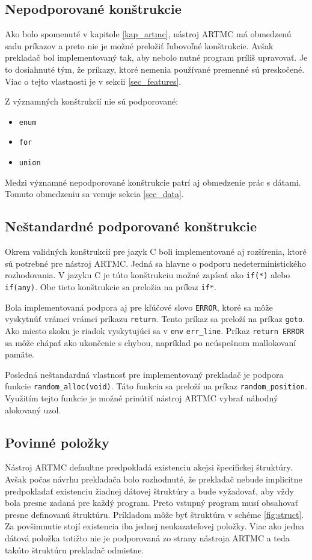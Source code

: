 \subsection{Nepodporované konštrukcie}
Ako bolo spomenuté v kapitole \ref{kap_artmc}, nástroj ARTMC má obmedzenú sadu príkazov a preto nie je možné preložiť ľubovoľné konštrukcie. Avšak prekladač bol implementovaný tak, aby nebolo nutné program príliš upravovať. Je to dosiahnuté tým, že príkazy, ktoré nemenia používané premenné sú preskočené. Viac o tejto vlastnosti je v sekcii \ref{sec_features}.

Z významných konštrukcií nie sú podporované:
\begin{itemize}
\item \texttt{enum}
\item \texttt{for}
\item \texttt{union}
\end{itemize}

Medzi významné nepodporované konštrukcie patrí aj obmedzenie prác s dátami. Tomuto obmedzeniu sa venuje sekcia \ref{sec_data}.

\subsection{Neštandardné podporované konštrukcie}
Okrem validných konštrukcií pre jazyk C boli implementované aj rozšírenia, ktoré sú potrebné pre nástroj ARTMC. Jedná sa hlavne o podporu nedeterministického rozhodovania. V jazyku C je túto konštrukciu možné zapísať ako \texttt{if(*)} alebo \texttt{if(any)}. Obe tieto konštrukcie sa preložia na príkaz \texttt{if*}.

Bola implementovaná podpora aj pre kľúčové slovo \texttt{ERROR}, ktoré sa môže vyskytnúť vrámci vrámci príkazu \texttt{return}. Tento príkaz sa preloží na príkaz \texttt{goto}. Ako miesto skoku je riadok vyskytujúci sa v \texttt{env} \texttt{err\_line}. Príkaz \texttt{return ERROR} sa môže chápať ako ukončenie s chybou, napríklad po neúspešnom mallokovaní pamäte.

Posledná neštandardná vlastnosť pre implementovaný prekladač je podpora funkcie \texttt{random\_alloc(void)}. Táto funkcia sa preloží na príkaz \texttt{random\_position}. Využitím tejto funkcie je možné prinútiť nástroj ARTMC vybrať náhodný alokovaný uzol.

\subsection{Povinné položky}
Nástroj ARTMC defaultne predpokladá existenciu akejsi špecifickej štruktúry. Avšak počas návrhu prekladača bolo rozhodnuté, že prekladač nebude implicitne predpokladať existenciu žiadnej dátovej štruktúry a bude vyžadovať, aby vždy bola presne zadaná pre každý program. Preto vstupný program musí obsahovať presne definovanú štruktúru. Príkladom môže byť štruktúra v schéme \ref{fig:struct}. Za povšimnutie stojí existencia iba jednej neukazateľovej položky. Viac ako jedna dátová položka totižto nie je podporovaná zo strany nástroja ARTMC a teda takúto štruktúru prekladač odmietne.


